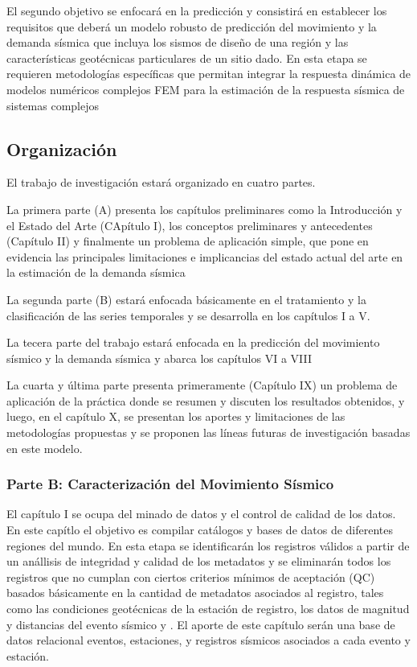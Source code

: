 \documentclass[
]{krantz}
\begin{document}
El segundo objetivo se enfocará en la predicción y consistirá en establecer los requisitos que deberá un modelo robusto de predicción del movimiento y la demanda sísmica que incluya los sismos de diseño de una región y las características geotécnicas particulares de un sitio dado. En esta etapa se requieren metodologías específicas que permitan integrar la respuesta dinámica de modelos numéricos complejos FEM para la estimación de la respuesta sísmica de sistemas complejos

\hypertarget{organizaciuxf3n}{%
\subsection*{Organización}\label{organizaciuxf3n}}

El trabajo de investigación estará organizado en cuatro partes.

La primera parte (A) presenta los capítulos preliminares como la Introducción y el Estado del Arte (CApítulo I), los conceptos preliminares y antecedentes (Capítulo II) y finalmente un problema de aplicación simple, que pone en evidencia las principales limitaciones e implicancias del estado actual del arte en la estimación de la demanda sísmica

La segunda parte (B) estará enfocada básicamente en el tratamiento y la clasificación de las series temporales y se desarrolla en los capítulos I a V.

La tecera parte del trabajo estará enfocada en la predicción del movimiento sísmico y la demanda sísmica y abarca los capítulos VI a VIII

La cuarta y última parte presenta primeramente (Capítulo IX) un problema de aplicación de la práctica donde se resumen y discuten los resultados obtenidos, y luego, en el capítulo X, se presentan los aportes y limitaciones de las metodologías propuestas y se proponen las líneas futuras de investigación basadas en este modelo.

\hypertarget{parte-b-caracterizaciuxf3n-del-movimiento-suxedsmico}{%
\subsubsection*{Parte B: Caracterización del Movimiento Sísmico}\label{parte-b-caracterizaciuxf3n-del-movimiento-suxedsmico}}

El capítulo I se ocupa del minado de datos y el control de calidad de los datos. En este capítlo el objetivo es compilar catálogos y bases de datos de diferentes regiones del mundo. En esta etapa se identificarán los registros válidos a partir de un anállisis de integridad y calidad de los metadatos y se eliminarán todos los registros que no cumplan con ciertos criterios mínimos de aceptación (QC) basados básicamente en la cantidad de metadatos asociados al registro, tales como las condiciones geotécnicas de la estación de registro, los datos de magnitud y distancias del evento sísmico y . El aporte de este capítulo serán una base de datos relacional eventos, estaciones, y registros sísmicos asociados a cada evento y estación.
\end{document}
